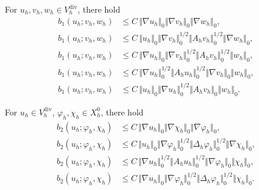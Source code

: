\begin{lemma}
  \label{lem:2}
  For $u_{h},v_{h},w_{h}\in V_{h}^{\mathrm{div}}$, there hold
  \begin{align}
    b_{1}(u_{h};v_{h},w_{h})
    &\le C\,\Vert\nabla u_{h}\Vert_{0}
            \Vert\nabla v_{h}\Vert_{0}
            \Vert\nabla w_{h}\Vert_{0},
    \label{eq:b1-est1}\\
    b_{1}(u_{h};v_{h},w_{h})
    &\le C\,\Vert u_{h}\Vert_{0}
            \Vert\nabla v_{h}\Vert_{0}^{1/2}
            \Vert A_{h}v_{h}\Vert_{0}^{1/2}
            \Vert\nabla w_{h}\Vert_{0},
    \label{eq:b1-est2}\\
    b_{1}(u_{h};v_{h},w_{h})
    &\le C\,\Vert\nabla u_{h}\Vert_{0}
            \Vert\nabla v_{h}\Vert_{0}^{1/2}
            \Vert A_{h}v_{h}\Vert_{0}^{1/2}
            \Vert w_{h}\Vert_{0},
    \label{eq:b1-est3}\\
    b_{1}(u_{h};v_{h},w_{h})
    &\le C\,\Vert\nabla u_{h}\Vert_{0}^{1/2}
            \Vert A_{h}u_{h}\Vert_{0}^{1/2}
            \Vert\nabla v_{h}\Vert_{0}
            \Vert w_{h}\Vert_{0},
    \label{eq:b1-est4}\\
    b_{1}(u_{h};v_{h},w_{h})
    &\le C\,\Vert u_{h}\Vert_{0}
            \Vert\nabla u_{h}\Vert_{0}^{1/2}
            \Vert A_{h}v_{h}\Vert_{0}
            \Vert w_{h}\Vert_{0}.
    \label{eq:b1-est5}
  \end{align}
\end{lemma}

\begin{lemma}
  \label{lem:3}
  For $u_{h}\in V_{h}^{\mathrm{div}}$, $\varphi_{h},\chi_{h}\in X^{0}_{h}$,
  there hold
  \begin{align}
    b_{2}(u_{h};\varphi_{h},\chi_{h})
    &\le C\,\Vert\nabla u_{h}\Vert_{0}
            \Vert\nabla\chi_{h}\Vert_{0}
            \Vert\nabla\varphi_{h}\Vert_{0},
    \label{eq:b2-est1}\\
    b_{2}(u_{h};\varphi_{h},\chi_{h})
    &\le C\,\Vert u_{h}\Vert_{0}
            \Vert\nabla\varphi_{h}\Vert_{0}^{1/2}
            \Vert\Delta_{h}\varphi_{h}\Vert_{0}^{1/2}
            \Vert\nabla\chi_{h}\Vert_{0},
    \label{eq:b2-est2}\\
    b_{2}(u_{h};\varphi_{h},\chi_{h})
    &\le C\,\Vert\nabla u_{h}\Vert_{0}^{1/2}
            \Vert A_{h}u_{h}\Vert_{0}^{1/2}
            \Vert\nabla\varphi_{h}\Vert_{0}
            \Vert\chi_{h}\Vert_{0},
    \label{eq:b2-est3}\\
    b_{2}(u_{h};\varphi_{h},\chi_{h})
    &\le C\,\Vert\nabla u_{h}\Vert_{0}
            \Vert\nabla\varphi_{h}\Vert_{0}^{1/2}
            \Vert\Delta_{h}\varphi_{h}\Vert_{0}^{1/2}
            \Vert\chi_{h}\Vert_{0}.
    \label{eq:b2-est4}
  \end{align}
\end{lemma}

